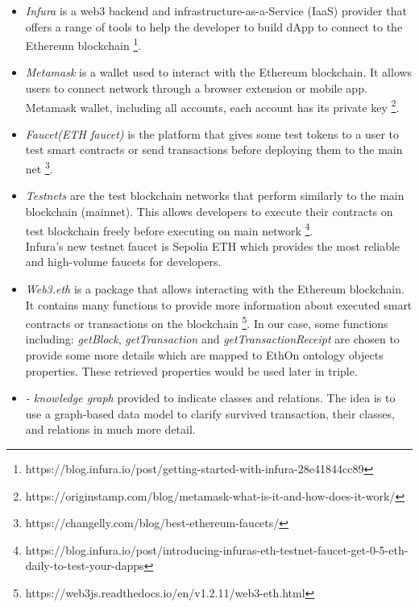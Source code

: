 \begin{itemize}
\item \textit{Infura} is a web3 backend and infrastructure-as-a-Service (IaaS) provider that offers a range of tools to help the developer to build dApp to connect to the Ethereum blockchain \footnote{https://blog.infura.io/post/getting-started-with-infura-28e41844cc89}.\\
\item \textit{Metamask} is a wallet used to interact with the Ethereum blockchain. It allows users to connect network through a browser extension or mobile app. Metamask wallet, including all accounts, each account has its private key \footnote{https://originstamp.com/blog/metamask-what-is-it-and-how-does-it-work/}.\\
\item \textit{Faucet(ETH faucet)} is the platform that gives some test tokens to a user to test smart contracts or send transactions before deploying them to the main net \footnote{https://changelly.com/blog/best-ethereum-faucets/}. \\
\item \textit{Testnets} are the test blockchain networks that perform similarly to the main blockchain (mainnet). This allows developers to execute their contracts on test blockchain freely before executing on main network \footnote{https://blog.infura.io/post/introducing-infuras-eth-testnet-faucet-get-0-5-eth-daily-to-test-your-dapps}.\\
Infura's new testnet faucet is Sepolia ETH which provides the most reliable and high-volume faucets for developers. \\
\item \textit{Web3.eth} is a package that allows interacting with the Ethereum blockchain. It contains many functions to provide more information about executed smart contracts or transactions on the blockchain \footnote{https://web3js.readthedocs.io/en/v1.2.11/web3-eth.html}. 
In our case, some functions including: \textit{getBlock}, \textit{getTransaction} and \textit{getTransactionReceipt} are chosen to provide some more details which are mapped to EthOn ontology objects properties. These retrieved properties would be used later in triple.\\
\item \textit{- knowledge graph} provided to indicate classes and relations.
The idea is to use a graph-based data model to clarify survived transaction, their classes, and relations in much more detail. 
\begin{center}
	

\end{center}
\end{itemize}
